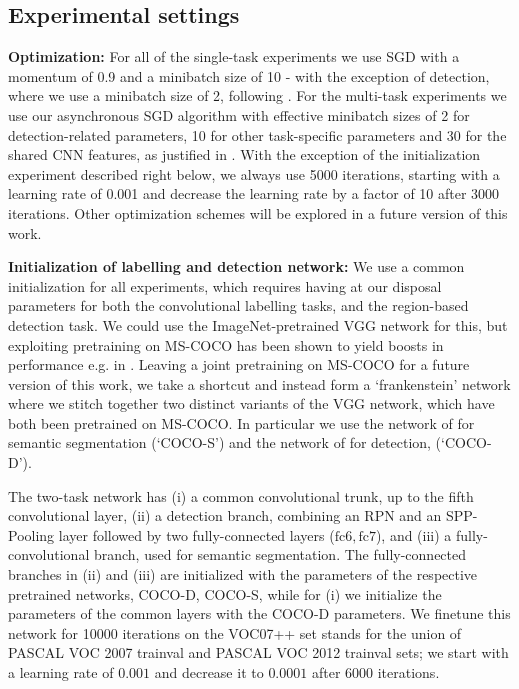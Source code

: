 \documentclass[10pt,twocolumn,letterpaper]{article}
\begin{document}
 
 \subsection{Experimental settings}
 \label{settings}
 \textbf{Optimization: } For all of the single-task experiments  we use SGD with a momentum of 0.9 and a minibatch size of 10 - with the exception of detection, where we use a minibatch size of 2, following \cite{Girshick15}.  For the multi-task experiments we use our asynchronous SGD algorithm with effective minibatch sizes of 2 for detection-related parameters, 10 for other task-specific parameters and 30 for the shared CNN features, as justified in . 
 With the exception of the initialization experiment described right below, we always use 5000 iterations, starting with a learning rate of 0.001 and decrease the learning rate by a factor of 10 after 3000 iterations. Other optimization schemes will be explored in a future version of this work.
 
  
\textbf{Initialization of labelling and detection network:}
We  use a common initialization for all experiments, which requires having at our disposal parameters for both the convolutional labelling tasks, and the region-based detection task. We could use the ImageNet-pretrained VGG network for this, but exploiting pretraining on MS-COCO has been shown to yield boosts in performance e.g. in \cite{ChenPK0Y16,Girshick15}. Leaving a joint pretraining on MS-COCO for a future version of this work, we take a shortcut and instead form a `frankenstein' network  where we stitch together two distinct  variants of the VGG network, which have both been pretrained on MS-COCO. In particular we use the network of \cite{ChenPK0Y16} for semantic segmentation (`COCO-S') and the network of \cite{Girshick15} for detection, (`COCO-D'). 
 
The two-task network has (i) a common convolutional trunk, up to the fifth convolutional layer, (ii) a detection branch, combining an RPN and an SPP-Pooling layer followed by two fully-connected layers ($\mathrm{fc6,fc7}$), and (iii) a fully-convolutional branch, used for semantic segmentation. The fully-connected  branches  in (ii) and (iii) are initialized with the parameters of the respective pretrained networks, COCO-D, COCO-S, while for (i) we initialize the parameters of the common layers with the COCO-D parameters.  We finetune this network for 10000 iterations on the VOC07++ set \cite{Girshick15}  stands for  the union of PASCAL VOC 2007 trainval and PASCAL VOC 2012 trainval sets; we start with a learning rate of $0.001$ and decrease it to $0.0001$ after 6000 iterations.
\end{document}
